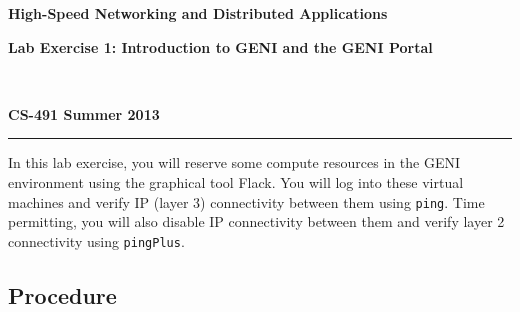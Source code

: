 \documentclass[12pt]{article}
\begin{document}
\raggedright
\centerline{\textbf{High-Speed Networking and Distributed Applications}}
\centerline{\textbf{Lab Exercise 1: Introduction to GENI and the GENI Portal}}
~\\
\centerline{\textbf{CS-491 \hfill Summer 2013}}
\noindent\rule{\textwidth}{1pt}

\bigskip
In this lab exercise, you will reserve some compute resources in the GENI 
environment using the graphical tool Flack. You will log into these virtual
machines and verify IP (layer 3) connectivity between them using 
\texttt{ping}. Time permitting, you will also disable IP connectivity between 
them and verify layer 2 connectivity using \texttt{pingPlus}.

\subsection*{Procedure}
\end{document}

